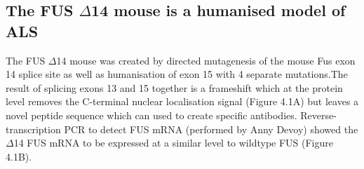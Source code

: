 
%

%
%
%

\subsection{The FUS $\Delta$14 mouse is a humanised model of ALS}
The FUS $\Delta$14 mouse was created by directed mutagenesis of the mouse Fus exon 14 splice site as well as humanisation of exon 15 with 4 separate mutations.The result of splicing exons 13 and 15 together is a frameshift which at the protein level removes the C-terminal nuclear localisation signal (Figure 4.1A) but leaves a novel peptide sequence which can used to create specific antibodies. Reverse-transcription PCR to detect FUS mRNA (performed by Anny Devoy) showed the $\Delta$14 FUS mRNA to be expressed at a similar level to wildtype FUS (Figure 4.1B). 



